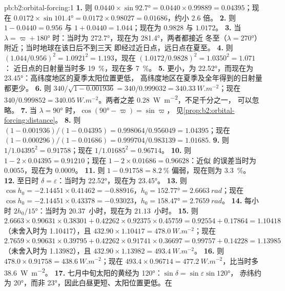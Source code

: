 \begin{solution}{pb:b2:orbital-forcing:1}
\textbf{1.} 则 $0.0440 \times \sin\ang{92.7} = 0.0440 \times 0.99889 = 0.04395$；现在 $0.0172 \times
\sin\ang{101.4} = 0.0172 \times 0.98027 = 0.01686$，约小 2.6 倍。
\textbf{2.} 则 $1 - 0.0440 = 0.956$ 与 $1 + 0.0440 = 1.044$；现在为 $0.9828$ 与 $1.0172$。
\textbf{3.} 当 $\lambda = \varpi + \ang{180}$ 时：当时为 \ang{272.7}，现在为 \ang{281.4}，两者都接近
冬至（$\lambda = \ang{270}$）附近；当时地球在该日后不到三天
即经过近日点，远日点在夏至。
\textbf{4.} 则 $(1.044/0.956)^2 = 1.0921^2 = 1.193$，现在 $(1.0172/0.9828)^2 = 1.0350^2 = 1.071$：
近日点的日射量当时多 \qty{19}{\percent}，现在多 \qty{7}{\percent}。
\textbf{5.} 更小，为 \ang{22.52}，而现在为 \ang{23.45}：高纬度地区的夏季太阳位置更低，
高纬度地区在夏季及全年得到的日射量都更少。
\textbf{6.} 则 $340/\sqrt{1 - 0.001936} = 340/0.999032 = \qty{340.33}{W.m^{-2}}$；现在 $340/0.999852
= \qty{340.05}{W.m^{-2}}$。两者之差 \qty{0.28}{W.m^{-2}}，不足千分之一，
可以忽略。
\textbf{7.} 当 $\lambda = \ang{90}$ 时，$\cos(\ang{90} - \varpi) = \sin\varpi$，
见\cref{prop:b2:orbital-forcing:distance}。
\textbf{8.} 则 $(1 - 0.001936)/(1 - 0.04395) = 0.998064/0.956049 = 1.04395$；现在 $(1 -
0.000296)/(1 - 0.01686) = 0.999704/0.983139 = 1.01685$.
\textbf{9.} 则 $1/1.04395^2 = 0.91758$；现在 $1/1.01685^2 = 0.96714$。
\textbf{10.} 则 $1 - 2 \times 0.04395 = 0.91210$；现在 $1 - 2 \times 0.01686 = 0.96628$：近似
的误差当时为 $0.0055$，现在为 $0.0009$。
\textbf{11.} 则 $1 - 0.91758 = \qty{8.2}{\percent}$ 偏弱，现在则为 \qty{3.3}{\percent}。
\textbf{12.} 至日时 $\delta = \varepsilon$：当时为 \ang{22.52}，现在为 \ang{23.45}。
\textbf{13.} 则 $\cos h_0 = -2.14451 \times 0.41462 = -0.88916$，$h_0 = \ang{152.77} =
\qty{2.6663}{rad}$；现在 $\cos h_0 = -2.14451 \times 0.43378 = -0.93023$，$h_0 = \ang{158.47} =
\qty{2.7659}{rad}$。
\textbf{14.} 每小时 $2h_0/\ang{15}$：当时为 $20.37$~小时，现在为 $21.13$~小时。
\textbf{15.} 则 $2.6663 \times 0.90631 \times 0.38301 + 0.42262 \times 0.92375 \times 0.45759 =
0.92554 + 0.17864 = 1.10418$（未舍入时为 \num{1.10417}），且 $432.90 \times 1.10417 =
\qty{478.0}{W.m^{-2}}$；现在 $2.7659 \times 0.90631 \times 0.39795 + 0.42262 \times 0.91741 \times
0.36697 = 0.99757 + 0.14228 = 1.13985$（未舍入时为 \num{1.13982}），且 $432.90 \times 1.13982 = \qty{493.4}{W.m^{-2}}$。
\textbf{16.} 则 $478.0 \times 0.91758 = \qty{438.6}{W.m^{-2}}$；现在 $493.4 \times 0.96714 =
\qty{477.2}{W.m^{-2}}$，比当时多 \qty{38.6}{W.m^{-2}}。
\textbf{17.} 七月中旬太阳的黄经为 \ang{120}：$\sin\delta = \sin\varepsilon\sin\ang{120}$，
赤纬约为 \ang{20}，而非 \ang{23}，因此白昼更短、太阳位置更低。在

\end{solution}
